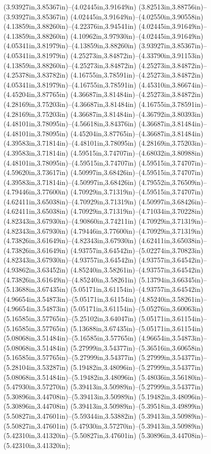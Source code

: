 (3.93927in,3.85367in)--(4.02445in,3.91649in) (3.82513in,3.88756in)--(3.93927in,3.85367in) (4.02445in,3.91649in)--(4.02550in,3.90558in) (4.13859in,3.88260in)--(4.22376in,3.94541in) (4.02445in,3.91649in)--(4.13859in,3.88260in) (4.10962in,3.97930in)--(4.02445in,3.91649in) (4.05341in,3.81979in)--(4.13859in,3.88260in) (3.93927in,3.85367in)--(4.05341in,3.81979in) (4.25273in,3.84872in)--(4.33790in,3.91153in) (4.13859in,3.88260in)--(4.25273in,3.84872in) (4.25273in,3.84872in)--(4.25378in,3.83782in) (4.16755in,3.78591in)--(4.25273in,3.84872in) (4.05341in,3.81979in)--(4.16755in,3.78591in) (4.45310in,3.86674in)--(4.45204in,3.87765in) (4.36687in,3.81484in)--(4.25273in,3.84872in) (4.28169in,3.75203in)--(4.36687in,3.81484in) (4.16755in,3.78591in)--(4.28169in,3.75203in) (4.36687in,3.81484in)--(4.36792in,3.80393in) (4.48101in,3.78095in)--(4.56618in,3.84376in) (4.36687in,3.81484in)--(4.48101in,3.78095in) (4.45204in,3.87765in)--(4.36687in,3.81484in) (4.39583in,3.71814in)--(4.48101in,3.78095in) (4.28169in,3.75203in)--(4.39583in,3.71814in) (4.59515in,3.74707in)--(4.68032in,3.80988in) (4.48101in,3.78095in)--(4.59515in,3.74707in) (4.59515in,3.74707in)--(4.59620in,3.73617in) (4.50997in,3.68426in)--(4.59515in,3.74707in) (4.39583in,3.71814in)--(4.50997in,3.68426in) (4.79552in,3.76509in)--(4.79446in,3.77600in) (4.70929in,3.71319in)--(4.59515in,3.74707in) (4.62411in,3.65038in)--(4.70929in,3.71319in) (4.50997in,3.68426in)--(4.62411in,3.65038in) (4.70929in,3.71319in)--(4.71034in,3.70228in) (4.82343in,3.67930in)--(4.90860in,3.74211in) (4.70929in,3.71319in)--(4.82343in,3.67930in) (4.79446in,3.77600in)--(4.70929in,3.71319in) (4.73826in,3.61649in)--(4.82343in,3.67930in) (4.62411in,3.65038in)--(4.73826in,3.61649in) (4.93757in,3.64542in)--(5.02274in,3.70823in) (4.82343in,3.67930in)--(4.93757in,3.64542in) (4.93757in,3.64542in)--(4.93862in,3.63452in) (4.85240in,3.58261in)--(4.93757in,3.64542in) (4.73826in,3.61649in)--(4.85240in,3.58261in) (5.13794in,3.66345in)--(5.13688in,3.67435in) (5.05171in,3.61154in)--(4.93757in,3.64542in) (4.96654in,3.54873in)--(5.05171in,3.61154in) (4.85240in,3.58261in)--(4.96654in,3.54873in) (5.05171in,3.61154in)--(5.05276in,3.60063in) (5.16585in,3.57765in)--(5.25102in,3.64047in) (5.05171in,3.61154in)--(5.16585in,3.57765in) (5.13688in,3.67435in)--(5.05171in,3.61154in) (5.08068in,3.51484in)--(5.16585in,3.57765in) (4.96654in,3.54873in)--(5.08068in,3.51484in) (5.27999in,3.54377in)--(5.36516in,3.60658in) (5.16585in,3.57765in)--(5.27999in,3.54377in) (5.27999in,3.54377in)--(5.28104in,3.53287in) (5.19482in,3.48096in)--(5.27999in,3.54377in) (5.08068in,3.51484in)--(5.19482in,3.48096in) (5.48036in,3.56180in)--(5.47930in,3.57270in) (5.39413in,3.50989in)--(5.27999in,3.54377in) (5.30896in,3.44708in)--(5.39413in,3.50989in) (5.19482in,3.48096in)--(5.30896in,3.44708in) (5.39413in,3.50989in)--(5.39518in,3.49899in) (5.50827in,3.47601in)--(5.59344in,3.53882in) (5.39413in,3.50989in)--(5.50827in,3.47601in) (5.47930in,3.57270in)--(5.39413in,3.50989in) (5.42310in,3.41320in)--(5.50827in,3.47601in) (5.30896in,3.44708in)--(5.42310in,3.41320in);
